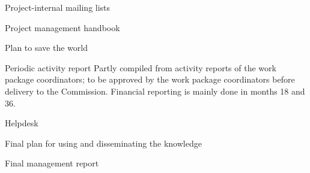 \begin{workpackage}[id=management,type=MGT,wphases=0-24!.2,
  title=Project Management,short=Management,
  jacuRM=2,barRM=2,efoRM=2,bazRM=2]
\begin{wpdelivs}
  \begin{wpdeliv}[due=1,id=mailing,nature=O,dissem=PP,miles=kickoff,]
    {Project-internal mailing lists}
  \end{wpdeliv}
  \begin{wpdeliv}[due=3,id=handbook,nature=R,dissem=PU,miles=consensus]
    {Project management handbook}
  \end{wpdeliv}
  \begin{wpdeliv}[due=44,id=worldpeace,nature=R,dissem=PU,miles=consensus,status=canceled]
    {Plan to save the world}
  \end{wpdeliv}
\begin{wpdeliv}[due={6,12,18,24,30,36,42,48},id=report2,nature=R,dissem=public,miles={consensus,final}]
  {Periodic activity report} 
  Partly compiled from activity reports of the work package
  coordinators; to be approved by the work package coordinators before delivery to the
  Commission.  Financial reporting is mainly done in months 18 and 36.
  \end{wpdeliv}
 \begin{wpdeliv}[due=6,id=helpdesk,dissem=PU,nature=O,miles=kickoff]
    {{\pn} Helpdesk}
  \end{wpdeliv}
  \begin{wpdeliv}[due=36,id=report6,nature=R,dissem=PU,miles=final]
    {Final plan for using and disseminating the knowledge}
  \end{wpdeliv}
  \begin{wpdeliv}[due=48,id=report7,nature=R,dissem=PU,miles=final]
    {Final management report}
  \end{wpdeliv}
\end{wpdelivs}
\end{workpackage}


